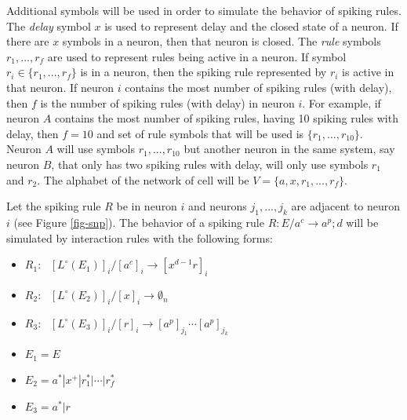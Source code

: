 \documentclass[a4paper]{article}
\theoremstyle{definition}
\newcommand{\ra}{\rightarrow}
\newcommand{\ts}{\text{ }}
\begin{document}
Additional symbols will be used in order to simulate the behavior of spiking rules. The \emph{delay}
symbol $x$ is used to represent delay and the closed state of a neuron. If there are $x$ symbols 
in a  neuron, then that neuron is closed. The \emph{rule} symbols $r_1,...,r_f$ are used to 
represent rules being active in a neuron. If symbol $r_i \in \{r_1,...,r_f\}$ is in a neuron, then 
the spiking rule represented by $r_i$ is active in that neuron. If neuron $i$ contains the 
most number of spiking rules (with delay), then $f$ is the number of spiking rules (with delay) in
neuron $i$. For example, if neuron $A$ contains the most number of spiking rules, having 10 spiking
rules with delay, then $f=10$ and set of rule symbols that will be used is $\{r_1,...,r_{10}\}$.
Neuron $A$ will use symbols $r_1,...,r_{10}$ but another neuron in the same system, say neuron $B$, 
that only has two spiking rules with delay, will only use symbols $r_1$ and $r_2$. The alphabet of 
the network of cell will be $V = \{a,x,r_1,...,r_f\}$.

Let the spiking rule $R$ be in neuron $i$ and neurons $j_1,...,j_k$ are adjacent to neuron $i$ (see
Figure \ref{fig-snp}). The behavior of a spiking rule $R: E/a^c \ra a^p;d$ will be simulated by 
interaction rules with the following forms:

\begin{multicols}{2}
\begin{itemize}
\item $R_1:\ts [L^{\circ}(E_1)]_i / [a^c]_i \ra [x^{d-1}r]_i$ 
\item $R_2:\ts [L^{\circ}(E_2)]_i / [x]_i \ra \emptyset_n$
\item $R_3:\ts [L^{\circ}(E_3)]_i / [r]_i  \ra [a^p]_{j_1}\cdots[a^p]_{j_k}$ 
\item $E_1 = E$
\item $E_2 = a^*|x^+|r_1^*|\cdots|r_f^*$
\item $E_3 = a^*|r$
\end{itemize}
\end{multicols}
\end{document}
